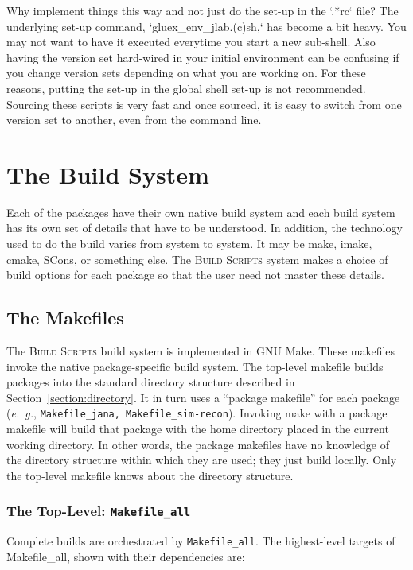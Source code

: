 \documentclass[12pt]{article}
\newcommand{\bs}{\textsc{Build Scripts}}
\begin{document}
Why implement things this way and not just do the set-up in the `.*rc`
file? The underlying set-up command, `gluex\_env\_jlab.(c)sh,` has
become a bit heavy. You may not want to have it executed everytime you
start a new sub-shell. Also having the version set hard-wired in your
initial environment can be confusing if you change version sets
depending on what you are working on. For these reasons, putting the
set-up in the global shell set-up is not recommended. Sourcing these
scripts is very fast and once sourced, it is easy to switch from one
version set to another, even from the command line.

\section{The Build System}

Each of the packages have their own native build system and each build
system has its own set of details that have to be understood. In
addition, the technology used to do the build varies from system to
system. It may be make, imake, cmake, SCons, or something else. The
\bs{} system makes a choice of build options for each package so that
the user need not master these details.

\subsection{The Makefiles}

The \bs{} build system is implemented in GNU Make. These makefiles
invoke the native package-specific build system. The top-level
makefile builds packages into the standard directory structure
described in Section~\ref{section:directory}. It in turn uses a
``package
makefile'' for each package ({\it e.~g.}, {\tt Makefile\_jana,
  Makefile\_sim-recon}). Invoking make with a package makefile will
build that package with the home directory placed in the current
working directory. In other words, the package makefiles have no knowledge of
the directory structure within which they are used; they just build
locally. Only the top-level makefile knows about the directory structure.

\subsubsection{The Top-Level: {\tt Makefile\_all}}

Complete builds are orchestrated by {\tt Makefile\_all}. The highest-level
targets of Makefile\_all, shown with their dependencies are:
\end{document}
